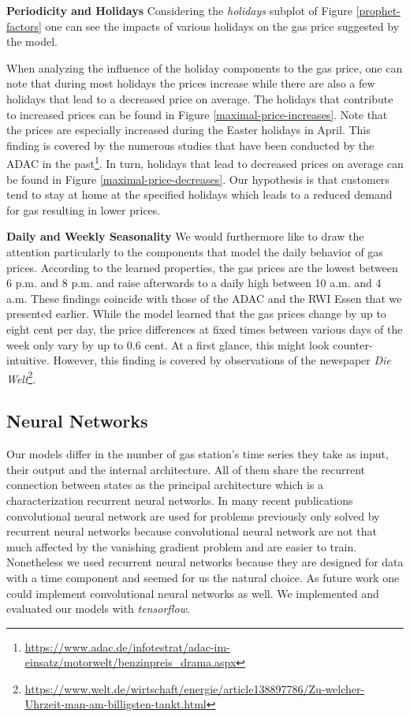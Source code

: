 \documentclass[%
a4paper,
DIV12,
2.5headlines,
bigheadings,
titlepage,
openbib,
]{scrartcl}
\begin{document}
\textbf{Periodicity and Holidays} 
Considering the \textit{holidays} subplot of Figure \ref{prophet-factors} one can see the impacts of various holidays on the gas price suggested by the model.

When analyzing the influence of the holiday components to the gas price, one can note that during most holidays the prices increase while there are also a few holidays that lead to a decreased price on average.
The holidays that contribute to increased prices can be found in Figure \ref{maximal-price-increases}.
Note that the prices are especially increased during the Easter holidays in April.
This finding is covered by the numerous studies that have been conducted by the ADAC in the past\footnote{\url{https://www.adac.de/infotestrat/adac-im-einsatz/motorwelt/benzinpreis\_drama.aspx}}.
In turn, holidays that lead to decreased prices on average can be found in Figure \ref{maximal-price-decreases}.
Our hypothesis is that customers tend to stay at home at the specified holidays which leads to a reduced demand for gas resulting in lower prices.

\textbf{Daily and Weekly Seasonality} 
We would furthermore like to draw the attention particularly to the components that model the daily behavior of gas prices.
According to the learned properties, the gas prices are the lowest between 6 p.m. and 8 p.m. and raise afterwards to a daily high between 10 a.m. and 4 a.m.
These findings coincide with those of the ADAC and the RWI Essen that we presented earlier.
While the model learned that the gas prices change by up to eight cent per day, the price differences at fixed times between various days of the week only vary by up to 0.6 cent.
At a first glance, this might look counter-intuitive.
However, this finding is covered by observations of the newspaper \textit{Die Welt}\footnote{\url{https://www.welt.de/wirtschaft/energie/article138897786/Zu-welcher-Uhrzeit-man-am-billigsten-tankt.html}}.


\subsection{Neural Networks}
Our models differ in the number of gas station's time series they take as input, their output and the internal architecture.
All of them share the recurrent connection between states as the principal architecture which is a characterization recurrent neural networks.
In many recent publications convolutional neural network are used for problems previously only solved by recurrent neural networks because convolutional neural network are not that much affected by the vanishing gradient problem and are easier to train.
Nonetheless we used recurrent neural networks because they are designed for data with a time component and seemed for us the natural choice.
As future work one could implement convolutional neural networks as well.
We implemented and evaluated our models with \textit{tensorflow}\citep{abadi2016tensorflow}.
\end{document}
